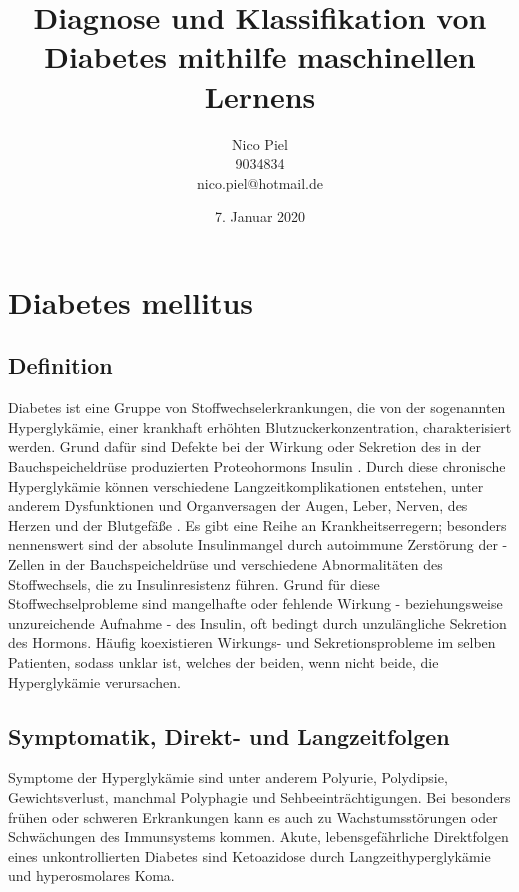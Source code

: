 \documentclass{article}
\title{Diagnose und Klassifikation von Diabetes mithilfe maschinellen Lernens}
\author{Nico Piel \\ 9034834 \\ nico.piel@hotmail.de}
\date{7. Januar 2020}
\begin{document}
\maketitle

\newpage

\tableofcontents

\newpage

\section{Diabetes mellitus}

\subsection{Definition}

Diabetes ist eine Gruppe von Stoffwechselerkrankungen, die von der sogenannten Hyperglykämie, einer krankhaft erhöhten Blutzuckerkonzentration, charakterisiert werden. Grund dafür sind Defekte bei der Wirkung oder Sekretion des in der Bauchspeicheldrüse produzierten Proteohormons Insulin \cite{ada}. Durch diese chronische Hyperglykämie können verschiedene Langzeitkomplikationen entstehen, unter anderem Dysfunktionen und Organversagen der Augen, Leber, Nerven, des Herzen und der Blutgefäße \cite{who}.
Es gibt eine Reihe an Krankheitserregern; besonders nennenswert sind der absolute Insulinmangel durch autoimmune Zerstörung der \textbeta-Zellen in der Bauchspeicheldrüse und verschiedene Abnormalitäten des Stoffwechsels, die zu Insulinresistenz führen. Grund für diese Stoffwechselprobleme sind mangelhafte oder fehlende Wirkung - beziehungsweise unzureichende Aufnahme - des Insulin, oft bedingt durch unzulängliche Sekretion des Hormons. Häufig koexistieren Wirkungs- und Sekretionsprobleme im selben Patienten, sodass unklar ist, welches der beiden, wenn nicht beide, die Hyperglykämie verursachen.

\subsection{Symptomatik, Direkt- und Langzeitfolgen}

Symptome der Hyperglykämie sind unter anderem Polyurie, Polydipsie, Gewichtsverlust, manchmal Polyphagie und Sehbeeinträchtigungen\footnotemark \cite{ada}. Bei besonders frühen oder schweren Erkrankungen kann es auch zu Wachstumsstörungen oder Schwächungen des Immunsystems kommen. Akute, lebensgefährliche Direktfolgen eines unkontrollierten Diabetes sind Ketoazidose durch Langzeithyperglykämie und hyperosmolares Koma\footnotemark[\value{footnote}] \cite{who}.
\end{document}
